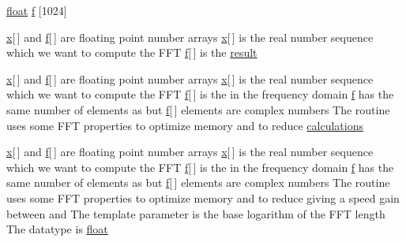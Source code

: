 \begin{DoxyCompactItemize}
\item 
\hyperlink{FFTReal__readme_8txt_a0ea2fae2a8106200bf378b90eae003cf}{float} \hyperlink{FFTReal__readme_8txt_abbf3cc73d1e3e4714ab1639819396eca}{f} \mbox{[}1024\mbox{]}
\item 
\hyperlink{FFTReal__readme_8txt_a9c92ac89d1560f812393ca39a19e581e}{x}\mbox{[}$\,$\mbox{]} and \hyperlink{FFTReal__readme_8txt_abbf3cc73d1e3e4714ab1639819396eca}{f}\mbox{[}$\,$\mbox{]} are floating point number arrays \hyperlink{FFTReal__readme_8txt_a9c92ac89d1560f812393ca39a19e581e}{x}\mbox{[}$\,$\mbox{]} is the real number sequence which we want to compute the F\+FT \hyperlink{FFTReal__readme_8txt_abbf3cc73d1e3e4714ab1639819396eca}{f}\mbox{[}$\,$\mbox{]} is the \hyperlink{FFTReal__readme_8txt_af64dcf51fedf6a89308c7e46c0868511}{result}
\item 
\hyperlink{FFTReal__readme_8txt_a9c92ac89d1560f812393ca39a19e581e}{x}\mbox{[}$\,$\mbox{]} and \hyperlink{FFTReal__readme_8txt_abbf3cc73d1e3e4714ab1639819396eca}{f}\mbox{[}$\,$\mbox{]} are floating point number arrays \hyperlink{FFTReal__readme_8txt_a9c92ac89d1560f812393ca39a19e581e}{x}\mbox{[}$\,$\mbox{]} is the real number sequence which we want to compute the F\+FT \hyperlink{FFTReal__readme_8txt_abbf3cc73d1e3e4714ab1639819396eca}{f}\mbox{[}$\,$\mbox{]} is the in the frequency domain \hyperlink{FFTReal__readme_8txt_abbf3cc73d1e3e4714ab1639819396eca}{f} has the same number of elements as but \hyperlink{FFTReal__readme_8txt_abbf3cc73d1e3e4714ab1639819396eca}{f}\mbox{[}$\,$\mbox{]} elements are complex numbers The routine uses some F\+FT properties to optimize memory and to reduce \hyperlink{FFTReal__readme_8txt_a65cbf8e61482778d7aa2ebe890cc7d7c}{calculations}
\item 
\hyperlink{FFTReal__readme_8txt_a9c92ac89d1560f812393ca39a19e581e}{x}\mbox{[}$\,$\mbox{]} and \hyperlink{FFTReal__readme_8txt_abbf3cc73d1e3e4714ab1639819396eca}{f}\mbox{[}$\,$\mbox{]} are floating point number arrays \hyperlink{FFTReal__readme_8txt_a9c92ac89d1560f812393ca39a19e581e}{x}\mbox{[}$\,$\mbox{]} is the real number sequence which we want to compute the F\+FT \hyperlink{FFTReal__readme_8txt_abbf3cc73d1e3e4714ab1639819396eca}{f}\mbox{[}$\,$\mbox{]} is the in the frequency domain \hyperlink{FFTReal__readme_8txt_abbf3cc73d1e3e4714ab1639819396eca}{f} has the same number of elements as but \hyperlink{FFTReal__readme_8txt_abbf3cc73d1e3e4714ab1639819396eca}{f}\mbox{[}$\,$\mbox{]} elements are complex numbers The routine uses some F\+FT properties to optimize memory and to reduce giving a speed gain between and The template parameter is the base logarithm of the F\+FT length The datatype is \hyperlink{FFTReal__readme_8txt_a0ea2fae2a8106200bf378b90eae003cf}{float}

\end{DoxyCompactItemize}
